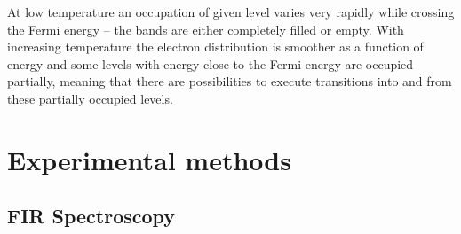 \documentclass[titlepage,a4paper]{book}
\newcommand{\wciecie}{\quad\phantom{v}}
\begin{document}
At low temperature an occupation of given level varies very rapidly while crossing the Fermi energy -- the bands are either completely filled or empty. With increasing temperature the electron distribution is smoother as a function of energy and some levels with energy close to the Fermi energy are occupied partially, meaning that there are possibilities to execute  transitions into and from these partially occupied levels. 

\section{Experimental methods}

\subsection{FIR Spectroscopy}
\wciecie


\end{document}
